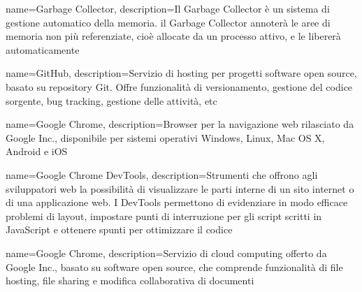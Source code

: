 {
	name=Garbage Collector,
	description={Il Garbage Collector è un sistema di gestione automatico della memoria. il Garbage Collector annoterà le aree di memoria non più referenziate, cioè allocate da un processo attivo, e le libererà automaticamente}
}


{
	name=GitHub,
	description={Servizio di hosting per progetti software open source, basato su repository Git. Offre funzionalità di versionamento, gestione del codice sorgente, bug tracking, gestione delle attività, etc}
}

{
	name=Google Chrome,
	description={Browser per la navigazione web rilasciato da Google Inc., disponibile per sistemi operativi Windows, Linux, Mac OS X, Android e iOS}
}

{
	name=Google Chrome DevTools,
	description={Strumenti che offrono agli sviluppatori web la possibilità di visualizzare le parti interne di un sito internet o di una applicazione web. I DevTools permettono di evidenziare in modo efficace problemi di layout, impostare punti di interruzione per gli script scritti in JavaScript e ottenere spunti per ottimizzare il codice}
}

{
	name=Google Chrome,
	description={Servizio di cloud computing offerto da Google Inc., basato su software open source, che comprende funzionalità di file hosting, file sharing e modifica collaborativa di documenti}
}
